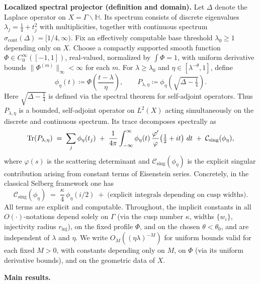 \medskip
\noindent\textbf{Localized spectral projector (definition and domain).}
Let $\Delta$ denote the Laplace operator on $X=\Gamma\backslash\mathbb{H}$.
Its spectrum consists of discrete eigenvalues
$\lambda_j = \tfrac{1}{4} + t_j^2$ with multiplicities, together with
continuous spectrum $\sigma_{\mathrm{cont}}(\Delta)=[1/4,\infty)$. Fix an
effectively computable base threshold $\lambda_0\ge1$ depending only on $X$.
Choose a compactly supported smooth function $\Phi\in C^\infty_0([-1,1])$,
real-valued, normalized by $\int \Phi = 1$, with uniform derivative bounds
$\|\Phi^{(m)}\|_\infty < \infty$ for each $m$. For $\lambda\ge\lambda_0$ and
$\eta \in [\lambda^{-\theta},1]$, define
\[
  \phi_\eta(t) \coloneqq \Phi\!\left(\frac{t-\lambda}{\eta}\right),
  \qquad
  P_{\lambda,\eta} \coloneqq \phi_\eta\!\left(\sqrt{\Delta - \tfrac{1}{4}}\right).
\]
Here $\sqrt{\Delta - \tfrac{1}{4}}$ is defined via the spectral theorem for
self-adjoint operators. Thus $P_{\lambda,\eta}$ is a bounded, self-adjoint
operator on $L^2(X)$ acting simultaneously on the discrete and continuous
spectrum. Its trace decomposes spectrally as
\begin{equation}\label{eq:trace-decomp}
  \operatorname{Tr}(P_{\lambda,\eta})
  \;=\; \sum_j \phi_\eta(t_j)
        \;+\; \frac{1}{4\pi}\int_{-\infty}^{\infty}
        \phi_\eta(t)\,\frac{\varphi'}{\varphi}\!\left(\tfrac12+it\right)\,dt
        \;+\; \mathcal{C}_{\mathrm{sing}}(\phi_\eta),
\end{equation}
where $\varphi(s)$ is the scattering determinant and
$\mathcal{C}_{\mathrm{sing}}(\phi_\eta)$ is the explicit singular contribution
arising from constant terms of Eisenstein series. Concretely, in the classical
Selberg framework one has
\[
  \mathcal{C}_{\mathrm{sing}}(\phi_\eta)
  \;=\; \frac{\kappa}{4}\,\phi_\eta(i/2) \;+\; \text{(explicit integrals depending on cusp widths)}.
\]
All terms are explicit and computable. Throughout, the implicit constants in
all $O(\cdot)$-notations depend solely on $\Gamma$ (via the cusp number $\kappa$,
widths $\{w_i\}$, injectivity radius $r_{\mathrm{inj}}$), on the fixed profile
$\Phi$, and on the chosen $\theta<\theta_0$, and are independent of $\lambda$
and $\eta$. We write $O_M((\eta\lambda)^{-M})$ for uniform bounds valid for each
fixed $M>0$, with constants depending only on $M$, on $\Phi$ (via its uniform
derivative bounds), and on the geometric data of $X$.

\medskip
\noindent\textbf{Main results.}

